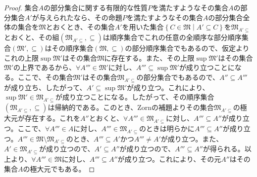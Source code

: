 \documentclass[dvipdfmx]{jsarticle}
\begin{document}
\begin{proof}
集合$A$の部分集合に関する有限的な性質$P$を満たすようなその集合$A$の部分集合$A'$が与えられたなら、その命題$P$を満たすようなその集合$A$の部分集合全体の集合を$\mathfrak{M}$とおくとき、その集合$A'$を用いた集合$\left\{ C \in \mathfrak{M} \middle| A' \subseteq C \right\}$を$\mathfrak{M}_{A' \subseteq}$とおくと、その組$\left( \mathfrak{M}_{A' \subseteq}, \subseteq \right)$は順序集合でこれの任意の全順序な部分順序集合$\left( \mathfrak{M}', \subseteq \right)$はその順序集合$\left( \mathfrak{M, \subseteq} \right)$の部分順序集合でもあるので、仮定よりこれの上限$\sup\mathfrak{M}'$はその集合$\mathfrak{M}$に存在する。また、その上限$\sup\mathfrak{M}'$はその集合$\mathfrak{M}'$の上界であるから、$\forall A''' \in \mathfrak{M}'$に対し、$A''' \subseteq \sup\mathfrak{M}'$が成り立つことになる。ここで、その集合$\mathfrak{M}'$はその集合$\mathfrak{M}_{A' \subseteq}$の部分集合でもあるので、$A'' \subseteq A'''$が成り立ち、したがって、$A' \subseteq \sup\mathfrak{M}'$が成り立つ。これにより、$\sup\mathfrak{M}' \in \mathfrak{M}_{A' \subseteq}$が成り立つことになる。したがって、その順序集合$\left( \mathfrak{M}_{A' \subseteq}, \subseteq \right)$は帰納的である。このとき、Zornの補題よりその集合$\mathfrak{M}_{A' \subseteq}$の極大元が存在する。これを$A''$とおくと、$\forall A''' \in \mathfrak{M}_{A' \subseteq}$に対し、$A''' \subseteq A''$が成り立つ。ここで、$\forall A''' \in A$に対し、$A''' \in \mathfrak{M}_{A' \subseteq}$のときは明らかに$A''' \subseteq A''$が成り立つ。$A'''\in \mathfrak{M \setminus}\mathfrak{M}_{A' \subseteq}$のとき、$A''' \subseteq A'$かつ$A''' \neq A'$が成り立つ。また、$A' \in \mathfrak{M}_{A' \subseteq}$が成り立つので、$A' \subseteq A''$が成り立つので、$A''' \subseteq A''$が得られる。以上より、$\forall A'''\in \mathfrak{M}$に対し、$A''' \subseteq A''$が成り立つ。これにより、その元$A''$はその集合$A$の極大元でもある。
\end{proof}
\end{document}
